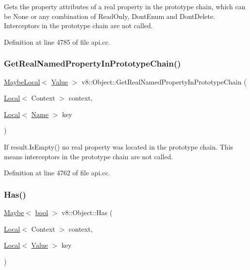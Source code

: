 Gets the property attributes of a real property in the prototype chain, which can be None or any combination of Read\+Only, Dont\+Enum and Dont\+Delete. Interceptors in the prototype chain are not called. 

Definition at line 4785 of file api.\+cc.

\mbox{\label{classv8_1_1Object_a48891efc7582cdd38a6d161203899e70}} 
\subsubsection{\texorpdfstring{Get\+Real\+Named\+Property\+In\+Prototype\+Chain()}{GetRealNamedPropertyInPrototypeChain()}}
{\footnotesize\ttfamily \mbox{\hyperlink{classv8_1_1MaybeLocal}{Maybe\+Local}}$<$ \mbox{\hyperlink{classv8_1_1Value}{Value}} $>$ v8\+::\+Object\+::\+Get\+Real\+Named\+Property\+In\+Prototype\+Chain (\begin{DoxyParamCaption}\item[{\mbox{\hyperlink{classv8_1_1Local}{Local}}$<$ Context $>$}]{context,  }\item[{\mbox{\hyperlink{classv8_1_1Local}{Local}}$<$ \mbox{\hyperlink{classv8_1_1Name}{Name}} $>$}]{key }\end{DoxyParamCaption})}

If result.\+Is\+Empty() no real property was located in the prototype chain. This means interceptors in the prototype chain are not called. 

Definition at line 4762 of file api.\+cc.

\mbox{\label{classv8_1_1Object_a548a8d4329cf890be3698f1bff9b9837}} 
\subsubsection{\texorpdfstring{Has()}{Has()}}
{\footnotesize\ttfamily \mbox{\hyperlink{classv8_1_1Maybe}{Maybe}}$<$ \mbox{\hyperlink{classbool}{bool}} $>$ v8\+::\+Object\+::\+Has (\begin{DoxyParamCaption}\item[{\mbox{\hyperlink{classv8_1_1Local}{Local}}$<$ Context $>$}]{context,  }\item[{\mbox{\hyperlink{classv8_1_1Local}{Local}}$<$ \mbox{\hyperlink{classv8_1_1Value}{Value}} $>$}]{key }\end{DoxyParamCaption})}

